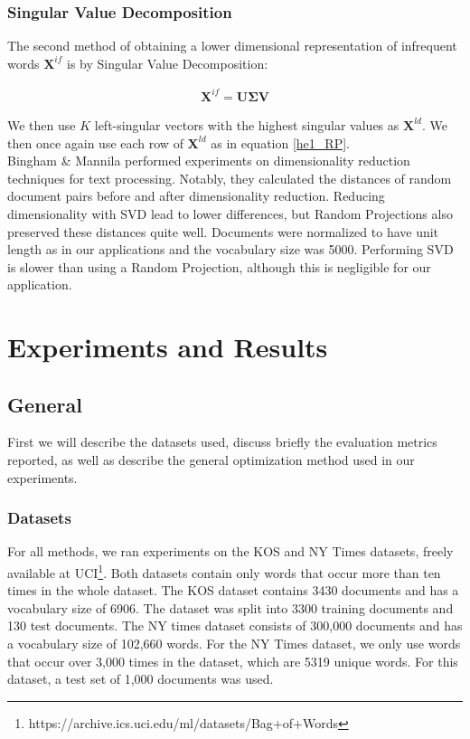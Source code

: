 \documentclass{report}
\begin{document}
\subsection{Singular Value Decomposition}\label{SVD}
The second method of obtaining a lower dimensional representation of infrequent words $\mathbf{X}^{if}$ is by Singular Value Decomposition:

\begin{align}
\mathbf{X}^{if} = \mathbf{U\Sigma V}
\end{align}

We then use $K$ left-singular vectors with the highest singular values as $\mathbf{X}^{ld}$. We then once again use each row of $\mathbf{X}^{ld}$ as in equation \ref{he1_RP}.\\
 Bingham \& Mannila \cite{bingham2001random} performed experiments on dimensionality reduction techniques for text processing. Notably, they calculated the distances of random document pairs before and after dimensionality reduction. Reducing dimensionality with SVD lead to lower differences, but Random Projections also preserved these distances quite well. Documents were normalized to have unit length as in our applications and the vocabulary size was 5000. Performing SVD is slower than using a Random Projection, although this is negligible for our application. 


\chapter{Experiments and Results}\label{experiments}
\section{General}
First we will describe the datasets used, discuss briefly the evaluation metrics reported, as well as describe the general optimization method used in our experiments.
	\subsection{Datasets}\label{datasets}
	For all methods, we ran experiments on the KOS and NY Times datasets, freely available at UCI\footnote{https://archive.ics.uci.edu/ml/datasets/Bag+of+Words}. Both datasets contain only words that occur more than ten times in the whole dataset. The KOS dataset contains 3430 documents and has a vocabulary size of 6906. The dataset was split into 3300 training documents and 130 test documents. The NY times dataset consists of 300,000 documents and has a vocabulary size of 102,660 words. For the NY Times dataset, we only use words that occur over 3,000 times in the dataset, which are 5319 unique words.  For this dataset, a test set of 1,000 documents was used.
\end{document}
